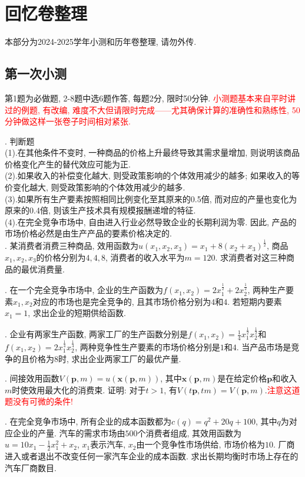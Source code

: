 
\chapter{回忆卷整理}
{\kaishu 本部分为2024-2025学年小测和历年卷整理, 请勿外传.}
\section{第一次小测}
{\fangsong 第1题为必做题, 2-8题中选6题作答, 每题2分, 限时50分钟.}
\textcolor{red}{小测题基本来自平时讲过的例题, 有改编, 难度不大但请限时完成——尤其确保计算的准确性和熟练性, 50分钟做这样一张卷子时间相对紧张.}

. 判断题\\
(1).在其他条件不变时, 一种商品的价格上升最终导致其需求量增加, 则说明该商品价格变化产生的替代效应可能为正.\\
(2).如果收入的补偿变化越大, 则受政策影响的个体效用减少的越多; 如果收入的等价变化越大, 则受政策影响的个体效用减少的越多.\\
(3).如果所有生产要素按照相同比例变化至其原来的0.5倍, 而对应的产量也变化为原来的0.4倍, 则该生产技术具有规模报酬递增的特征.\\ 
(4).在完全竞争市场中, 自由进入行业必然导致企业的长期利润为零. 因此, 产品的市场价格必然是由生产产品的要素价格决定的.\\

. 某消费者消费三种商品, 效用函数为$u(x_1,x_2,x_3)=x_1+8(x_2+x_3)^\frac{1}{2}$, 商品$x_1,x_2,x_3$的价格分别为$4,4,8$, 消费者的收入水平为$m=120$.
求消费者对这三种商品的最优消费量.


. 在一个完全竞争市场中, 企业的生产函数为$f(x_1,x_2)=2x_1^{\frac{1}{2}}+2x_2^{\frac{1}{2}}$, 两种生产要素$x_1,x_2$对应的市场也是完全竞争的, 
且其市场价格分别为$4$和$4$. 若短期内要素$x_1=1$, 求出企业的短期供给函数.


. 企业有两家生产函数, 两家工厂的生产函数分别是$f(x_1,x_2)=\frac{1}{4}x_1^\frac{1}{2}x_2^\frac{1}{2}$和$f(x_1,x_2)=2x_1^\frac{1}{4}x_2^\frac{1}{4}$,
两种竞争性生产要素的市场价格分别是$1$和$4$. 当产品市场是竞争的且价格为$8$时, 求出企业两家工厂的最优产量.

. 间接效用函数$V(\mathbf{p},m)=u(\mathbf{x}(\mathbf{p},m))$, 其中$\mathbf{x}(\mathbf{p},m)$是在给定价格$\mathbf{p}$和收入$m$时使效用最大化的消费束.
证明: 对于$t>1$, 有$V(t\mathbf{p},tm)=V(\mathbf{p},m)$.\textcolor{red}{注意这道题没有可微的条件!}


. 在完全竞争市场中, 所有企业的成本函数都为$c(q)=q^2+20q+100$, 其中$q$为对应企业的产量. 汽车的需求市场由$500$个消费者组成, 其效用函数为$u=10x_1-\frac{1}{2}x_1^2+x_2$, 
$x_1$表示汽车, $x_2$由一个竞争性市场供给, 市场价格为$10$. 厂商进入或者退出不改变任何一家汽车企业的成本函数. 求出长期均衡时市场上存在的汽车厂商数目.


